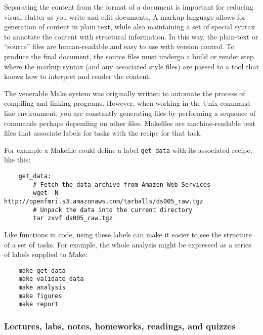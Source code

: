 Separating the content from the format of a document is important for reducing
visual clutter as you write and edit documents.
A markup language allows for generation of content in plain text, while also
maintaining a set of special syntax to annotate the content with structural
information.
In this way, the plain-text or ``source'' files are human-readable and easy to
use with version control.
To produce the final document, the source files must undergo a build or render
step where the markup syntax (and any associated style files) are passed to a
tool that knows how to interpret and render the content.


The venerable Make system was originally written to automate the process
of compiling and linking programs.
However, when working in the Unix command line environment, you are constantly
generating files by performing a sequence of commands perhaps depending on
other files.
Makefiles are machine-readable text files that associate labels for tasks with
the recipe for that task.

For example a Makefile could define a label \texttt{get\_data} with its
associated recipe, like this:

\begin{verbatim}
    get_data:
        # Fetch the data archive from Amazon Web Services
        wget -N http://openfmri.s3.amazonaws.com/tarballs/ds005_raw.tgz
        # Unpack the data into the current directory
        tar zxvf ds005_raw.tgz
\end{verbatim}

Like functions in code, using these labels can make it easier to see the
structure of a set of tasks.  For example, the whole analysis might be
expressed as a series of labels supplied to Make:

\begin{verbatim}
    make get_data
    make validate_data
    make analysis
    make figures
    make report
\end{verbatim}

\subsubsection{Lectures, labs, notes, homeworks, readings, and quizzes}

